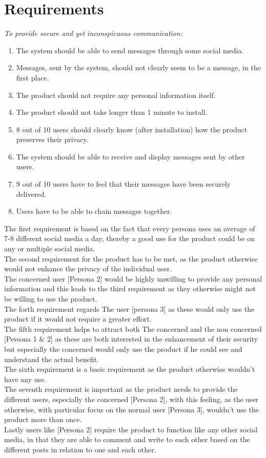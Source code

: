 \section{Requirements}
\textit{To provide secure and yet inconspicuous communication:}
\begin{enumerate}
    \item The system should be able to send messages through some social media.
    \item Messages, sent by the system, should not clearly seem to be a message, in the first place.
    \item The product should not require any personal information itself.
    \item The product should not take longer than 1 minute to install.
    \item 8 out of 10 users should clearly know (after installation) how the product preserves their privacy.
    \item The system should be able to receive and display messages sent by other users.
    \item 9 out of 10 users have to feel that their messages have been securely delivered.
    \item Users have to be able to chain messages together.
\end{enumerate}
\noindent
The first requirement is based on the fact that every persona uses an average of 7-8 different social media a day, thereby a good use for the product could be on any or multiple social media.\\
The second requirement for the product has to be met, as the product otherwise would not enhance the privacy of the individual user.\\
The concerned user [Persona 2] would be highly unwilling to provide any personal information and this leads to the third requirement as they otherwise might not be willing to use the product.\\
\noindent
The forth requirement regards The user [persona 3] as these would only use the product if it would not require a greater effort.\\
The fifth requirement helps to attract both The concerned and the non concerned [Persona 1 \& 2] as these are both interested in the enhancement of their security but especially the concerned would only use the product if he could see and understand the actual benefit.\\
The sixth requirement is a basic requirement as the product otherwise wouldn't have any use.\\
The seventh requirement is important as the product needs to provide the different users, especially the concerned [Persona 2], with this feeling, as the user otherwise, with particular focus on the normal user [Persona 3], wouldn't use the product more than once.\\
Lastly users like [Persona 2] require the product to function like any other social media, in that they are able to comment and write to each other based on the different posts in relation to one and each other.

